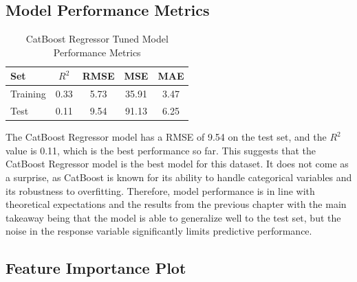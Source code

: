 \subsection{Model Performance Metrics}
\begin{table}[H]
    \centering
    \caption{CatBoost Regressor Tuned Model Performance Metrics}
    \label{tab:CatBoost_regressor_performance}
    \begin{tabular}{lcccc}
    \hline
    Set & $R^2$ & RMSE & MSE & MAE \\ 
    \hline
    Training & 0.33 & 5.73 & 35.91 & 3.47 \\
    Test & 0.11 & 9.54 & 91.13 & 6.25 \\
    \hline
    \end{tabular}
\end{table}
\noindent The CatBoost Regressor model has a RMSE of 9.54 on the test set, and the $R^2$ value is 0.11, which is the best performance so far. This suggests that the CatBoost Regressor model is the best model for this dataset. It does not come as a surprise, as CatBoost is known for its ability to handle categorical variables and its robustness to overfitting. Therefore, model performance is in line with theoretical expectations and the results from the previous chapter with the main takeaway being that the model is able to generalize well to the test set, but the noise in the response variable significantly limits predictive performance.


    

\subsection{Feature Importance Plot}

